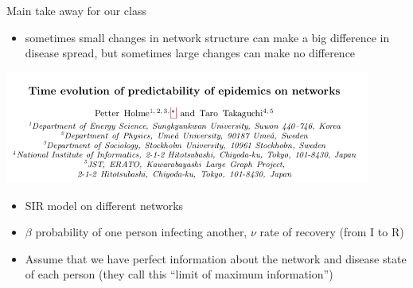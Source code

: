 \documentclass[aspectratio=169]{beamer}
\begin{document}
\begin{frame}

Main take away for our class
\begin{itemize}
\item sometimes small changes in network structure can make a big difference in disease spread, but sometimes large changes can make no difference
\end{itemize}

\end{frame}
\begin{frame}

\begin{center}
\includegraphics[width = 0.9\textwidth]{figures/holme_time_2015_title}
\end{center}

\end{frame}
\begin{frame}

\begin{itemize}
\item SIR model on different networks
\pause
\item $\beta$ probability of one person infecting another, $\nu$ rate of recovery (from I to R)
\pause
\item Assume that we have perfect information about the network and disease state of each person (they call this ``limit of maximum information'') 
\end{itemize}

\end{frame}
\end{document}
